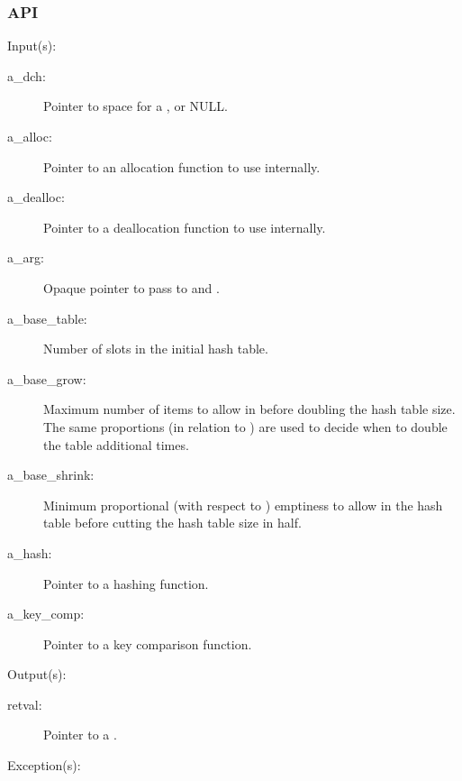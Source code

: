 \subsubsection{API}
\begin{capi}

\label{dch_new}
	\begin{capilist}
	\item[Input(s): ]
		\begin{description}\item[]
		\item[a\_dch: ]
			Pointer to space for a , or NULL.
		\item[a\_alloc: ]
			Pointer to an allocation function to use internally.
		\item[a\_dealloc: ]
			Pointer to a deallocation function to use internally.
		\item[a\_arg: ]
			Opaque pointer to pass to  and
			.
		\item[a\_base\_table: ]
			Number of slots in the initial hash table.
		\item[a\_base\_grow: ]
			Maximum number of items to allow in  before
			doubling the hash table size.  The same proportions (in
			relation to ) are used to decide
			when to double the table additional times.
		\item[a\_base\_shrink: ]
			Minimum proportional (with respect to
			) emptiness to allow in the hash
			table before cutting the hash table size in half.
		\item[a\_hash: ]
			Pointer to a hashing function.
		\item[a\_key\_comp: ]
			Pointer to a key comparison function.
		\end{description}
	\item[Output(s): ]
		\begin{description}\item[]
		\item[retval: ]
			Pointer to a .
		\end{description}
	\item[Exception(s): ]
		\begin{description}\item[]

\end{description}
\end{capilist}
\end{capi}
